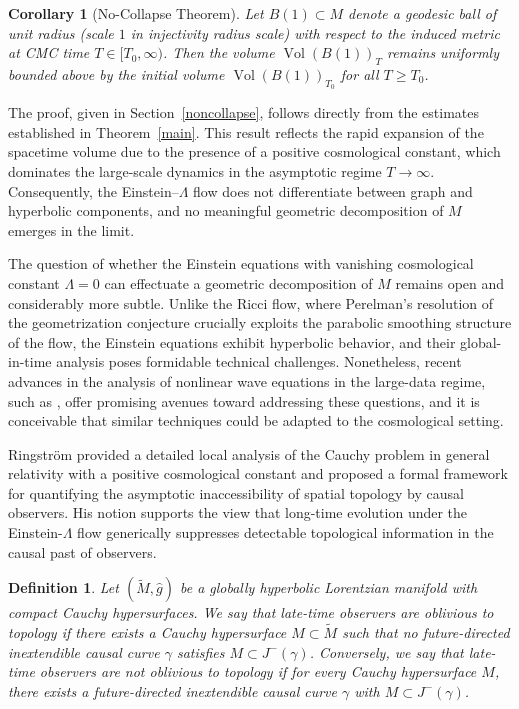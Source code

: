 \documentclass{amsart}
\newtheorem{definition}{Definition}
\newtheorem{corollary}{Corollary}[section]
\begin{document}
\begin{corollary}[No-Collapse Theorem]
\label{nocollapse}
Let \( B(1) \subset M \) denote a geodesic ball of unit radius (scale $1$ in injectivity radius scale) with respect to the induced metric at CMC time \( T \in [T_0, \infty) \). Then the volume \( \operatorname{Vol}(B(1))_T \) remains uniformly bounded above by the initial volume \( \operatorname{Vol}(B(1))_{T_0} \) for all \( T \geq T_0 \).
\end{corollary}

\noindent The proof, given in Section~\ref{noncollapse}, follows directly from the estimates established in Theorem~\ref{main}. This result reflects the rapid expansion of the spacetime volume due to the presence of a positive cosmological constant, which dominates the large-scale dynamics in the asymptotic regime \( T \to \infty \). Consequently, the Einstein–$\Lambda$ flow does not differentiate between graph and hyperbolic components, and no meaningful geometric decomposition of \( M \) emerges in the limit.

\noindent The question of whether the Einstein equations with vanishing cosmological constant \( \Lambda = 0 \) can effectuate a geometric decomposition of \( M \) remains open and considerably more subtle. Unlike the Ricci flow, where Perelman's resolution of the geometrization conjecture \cite{perelman2002ricci,perelman2003ricci,perelman2003ricci2} crucially exploits the parabolic smoothing structure of the flow, the Einstein equations exhibit hyperbolic behavior, and their global-in-time analysis poses formidable technical challenges. Nonetheless, recent advances in the analysis of nonlinear wave equations in the large-data regime, such as \cite{C09}, offer promising avenues toward addressing these questions, and it is conceivable that similar techniques could be adapted to the cosmological setting.  

\noindent Ringström \cite{ringstrom2008future} provided a detailed local analysis of the Cauchy problem in general relativity with a positive cosmological constant and proposed a formal framework for quantifying the asymptotic inaccessibility of spatial topology by causal observers. His notion supports the view that long-time evolution under the Einstein-$\Lambda$ flow generically suppresses detectable topological information in the causal past of observers.

\begin{definition}
Let $(\widetilde{M}, \widehat{g})$ be a globally hyperbolic Lorentzian manifold with compact Cauchy hypersurfaces. We say that \emph{late-time observers are oblivious to topology} if there exists a Cauchy hypersurface $M \subset \widetilde{M}$ such that no future-directed inextendible causal curve $\gamma$ satisfies $M \subset J^{-}(\gamma)$. Conversely, we say that \emph{late-time observers are not oblivious to topology} if for every Cauchy hypersurface $M$, there exists a future-directed inextendible causal curve $\gamma$ with $M \subset J^{-}(\gamma)$.
\end{definition}
\end{document}
